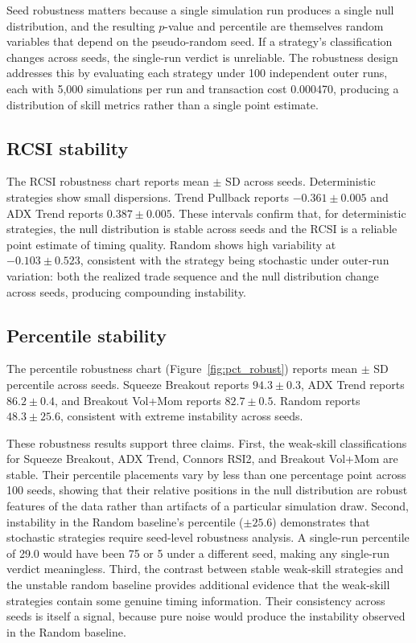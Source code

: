 \documentclass[preprint,12pt]{elsarticle}
\theoremstyle{definition}
\begin{document}
Seed robustness matters because a single simulation run produces a single null distribution, and the resulting $p$-value and percentile are themselves random variables that depend on the pseudo-random seed. If a strategy's classification changes across seeds, the single-run verdict is unreliable. The robustness design addresses this by evaluating each strategy under 100 independent outer runs, each with 5{,}000 simulations per run and transaction cost 0.000470, producing a distribution of skill metrics rather than a single point estimate.

\subsection{RCSI stability}

The RCSI robustness chart reports mean $\pm$ SD across seeds. Deterministic strategies show small dispersions. Trend Pullback reports $-0.361 \pm 0.005$ and ADX Trend reports $0.387 \pm 0.005$. These intervals confirm that, for deterministic strategies, the null distribution is stable across seeds and the RCSI is a reliable point estimate of timing quality. Random shows high variability at $-0.103 \pm 0.523$, consistent with the strategy being stochastic under outer-run variation: both the realized trade sequence and the null distribution change across seeds, producing compounding instability.

\subsection{Percentile stability}

The percentile robustness chart (Figure~\ref{fig:pct_robust}) reports mean $\pm$ SD percentile across seeds. Squeeze Breakout reports $94.3 \pm 0.3$, ADX Trend reports $86.2 \pm 0.4$, and Breakout Vol+Mom reports $82.7 \pm 0.5$. Random reports $48.3 \pm 25.6$, consistent with extreme instability across seeds.

These robustness results support three claims. First, the weak-skill classifications for Squeeze Breakout, ADX Trend, Connors RSI2, and Breakout Vol+Mom are stable. Their percentile placements vary by less than one percentage point across 100 seeds, showing that their relative positions in the null distribution are robust features of the data rather than artifacts of a particular simulation draw. Second, instability in the Random baseline's percentile ($\pm 25.6$) demonstrates that stochastic strategies require seed-level robustness analysis. A single-run percentile of 29.0 would have been 75 or 5 under a different seed, making any single-run verdict meaningless. Third, the contrast between stable weak-skill strategies and the unstable random baseline provides additional evidence that the weak-skill strategies contain some genuine timing information. Their consistency across seeds is itself a signal, because pure noise would produce the instability observed in the Random baseline.
\end{document}
